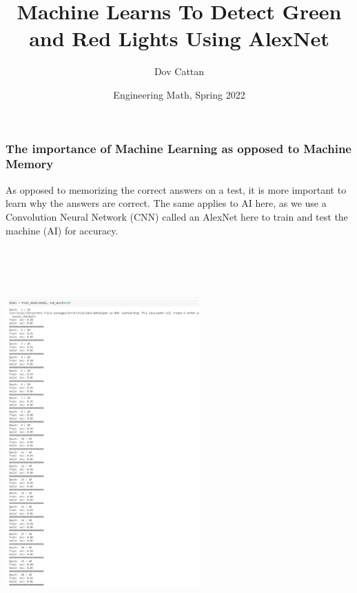 \documentclass{beamer}
\title[MAP 3305] %
{Machine Learns To Detect Green and Red Lights Using AlexNet}
\author[Cattan, Dov] %
{Dov Cattan}
\institute[FAU] %
{
  
  Student, Computer Engineering\\
  Florida Atlantic University
  
}
\date[ 2022] 
{
 Engineering Math, Spring 2022
\newline \newline 
}
\begin{document}
\frame{\titlepage}

\section{}


\begin{frame}
\frametitle{The importance of Machine Learning as opposed to Machine Memory}








As opposed to memorizing the correct answers on a test, it is more important to learn why the answers are correct. The same applies to AI here, as we use a Convolution Neural Network (CNN) called an AlexNet here to train and test the machine (AI) for accuracy.


  \begin{center}
     \includegraphics[height = 15cm,width=7.5cm]{training.PNG} 
  \end{center}

\end{frame}
\end{document}
